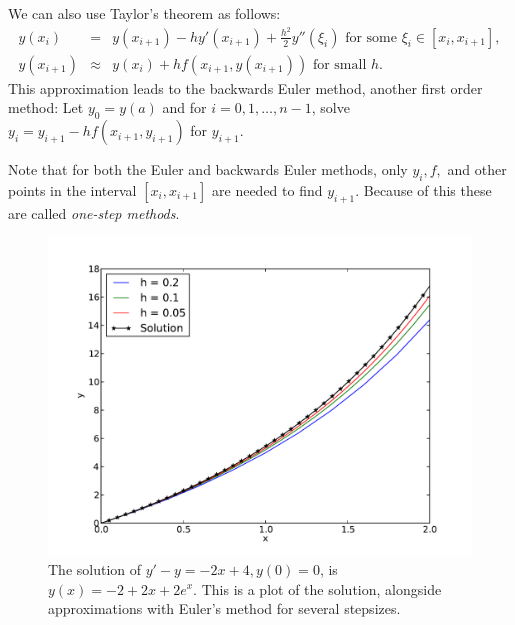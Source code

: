 We can also use Taylor's theorem as follows: 
\begin{eqnarray*}
y(x_{i}) &=& y(x_{i+1}) - h y'(x_{i+1}) + \frac{h^2}{2} y''(\xi_i) \text{ for some } \xi_i \in [x_i,x_{i+1}], \\
y(x_{i+1}) &\approx & y(x_{i}) + h f(x_{i+1},y(x_{i+1}))  \text{ for small } h .
\end{eqnarray*}
This approximation leads to the backwards Euler method, another first order method: Let $y_0 = y(a)$ and for $i = 0, 1, \hdots, n-1$, solve  $y_{i} = y_{i+1}-hf(x_{i+1},y_{i+1})$ for $y_{i+1}$.

Note that for both the Euler and backwards Euler methods, only $y_i, f, $ and other points in the interval $[x_i, x_{i+1}]$ are needed to find $y_{i+1}$. Because of this these are called \textit{one-step methods}. 




\begin{figure}[ht]
\centering
\includegraphics[width=\textwidth]{Fig1.pdf}
\caption{The solution of $y' -y= -2x+4, y(0) = 0$, is $y(x) = -2+2x + 2e^x.$ This is a plot of the solution, alongside approximations with Euler's method for several stepsizes.}
\label{ivp:euler}
\end{figure}



